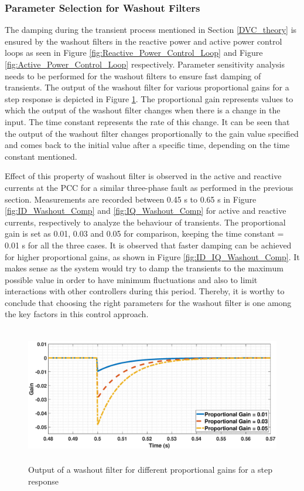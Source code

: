 \subsubsection{Parameter Selection for Washout Filters}\label{para_selection_washout}
The damping during the transient process mentioned in Section \ref{DVC_theory} is ensured by the washout filters in the reactive power and active power control loops as seen in Figure \ref{fig:Reactive_Power_Control_Loop} and Figure \ref{fig:Active_Power_Control_Loop} respectively. Parameter sensitivity analysis needs to be performed for the washout filters to ensure fast damping of transients. The output of the washout filter for various proportional gains for a step response is depicted in Figure \ref{fig:Washout_gain_output}. The proportional gain represents values to which the output of the washout filter changes when there is a change in the input. The time constant represents the rate of this change. It can be seen that the output of the washout filter changes proportionally to the gain value specified and comes back to the initial value after a specific time, depending on the time constant mentioned.


Effect of this property of washout filter is observed in the active and reactive currents at the \gls{PCC} for a similar three-phase fault as performed in the previous section. Measurements are recorded between 0.45 s to 0.65 s in Figure \ref{fig:ID_Washout_Comp} and \ref{fig:IQ_Washout_Comp} for active and reactive currents, respectively to analyze the behaviour of transients. The proportional gain is set as 0.01, 0.03 and 0.05 for comparison, keeping the time constant = 0.01 s for all the three cases. It is observed that faster damping can be achieved for higher proportional gains, as shown in Figure \ref{fig:ID_IQ_Washout_Comp}. It makes sense as the system would try to damp the transients to the maximum possible value in order to have minimum fluctuations and also to limit interactions with other controllers during this period. Thereby, it is worthy to conclude that choosing the right parameters for the washout filter is one among the key factors in this control approach.

\begin{figure}[H]
\centering
    \includegraphics[height = 6cm,width = 14.5cm]{Diagrams/Chapter_3/Washout_gain_output_4.eps}
    \caption{Output of a washout filter for different proportional gains for a step response}
    \label{fig:Washout_gain_output}
\end{figure}

